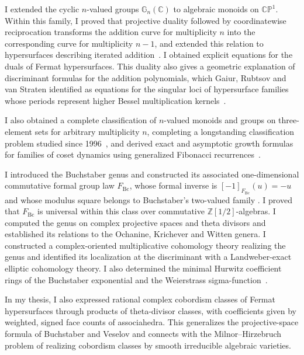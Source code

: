 \documentclass[12pt,a4paper,dvipsnames]{extarticle}
\begin{document}
I extended the cyclic $n$-valued groups $\mathbb G_n(\mathbb C)$ to algebraic monoids on $\mathbb{CP}^{1}$. Within this family, I proved that projective duality followed by coordinatewise reciprocation transforms the addition curve for multiplicity $n$ into the corresponding curve for multiplicity $n-1$, and extended this relation to hypersurfaces describing iterated addition~\cite{BK26Discriminants}. I obtained explicit equations for the duals of Fermat hypersurfaces. This duality also gives a geometric explanation of discriminant formulas for the addition polynomials, which Gaiur, Rubtsov and van Straten identified as equations for the singular loci of hypersurface families whose periods represent higher Bessel multiplication kernels~\cite{BK25ProjectiveDuality}.

I also obtained a complete classification of $n$-valued monoids and groups on three-element sets for arbitrary multiplicity $n$, completing a longstanding classification problem studied since 1996~\cite{Kor26Classification}, and derived exact and asymptotic growth formulas for families of coset dynamics using generalized Fibonacci recurrences~\cite{Kor24Dynamics}.

I introduced the Buchstaber genus and constructed its associated one-dimensional commutative formal group law $F_{\mathrm{Bc}}$, whose formal inverse is $[-1]_{F_{\mathrm{Bc}}}(u)=-u$ and whose modulus square belongs to Buchstaber's two-valued family \cite{Kor26Genera}. I proved that $F_{\mathrm{Bc}}$ is universal within this class over commutative $\mathbb Z[1/2]$-algebras. I computed the genus on complex projective spaces and theta divisors and established its relations to the Ochanine, Krichever and Witten genera. I constructed a complex-oriented multiplicative cohomology theory realizing the genus and identified its localization at the discriminant with a Landweber-exact elliptic cohomology theory. I also determined the minimal Hurwitz coefficient rings of the Buchstaber exponential and the Weierstrass sigma-function~\cite{Kor26GeneraV2}.

In my thesis, I also expressed rational complex cobordism classes of Fermat hypersurfaces through products of theta-divisor classes, with coefficients given by weighted, signed face counts of associahedra. This generalizes the projective-space formula of Buchstaber and Veselov and connects with the Milnor--Hirzebruch problem of realizing cobordism classes by smooth irreducible algebraic varieties.
\end{document}

